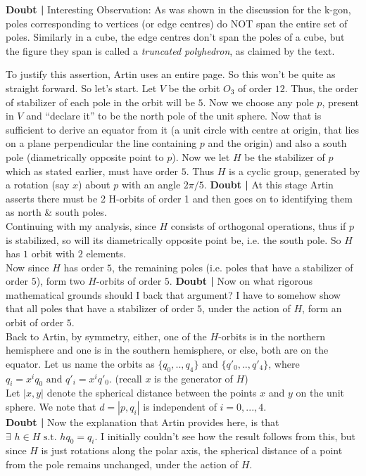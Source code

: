 \begin{aenumerate}
\par
{\bf Doubt | }Interesting Observation: As was shown in the discussion for the k-gon, poles corresponding to vertices (or edge centres) do NOT span the entire set of poles. Similarly in a cube, the edge centres don't span the poles of a cube, but the figure they span is called a \emph{truncated polyhedron}, as claimed by the text.
\item
To justify this assertion, Artin uses an entire page. So this won't be quite as straight forward. So let's start. Let $V$ be the orbit $O_{3}$ of order $12$. Thus, the order of stabilizer of each pole in the orbit will be $5$. Now we choose any pole $p$, present in $V$ and ``declare it'' to be the north pole of the unit sphere. Now that is sufficient to derive an equator from it (a unit circle with centre at origin, that lies on a plane perpendicular the line containing $p$ and the origin) and also a south pole (diametrically opposite point to $p$). Now we let $H$ be the stabilizer of $p$ which as stated earlier, must have order $5$. Thus $H$ is a cyclic group, generated by a rotation (say $x$) about $p$ with an angle $2\pi/5$. {\bf Doubt | } At this stage Artin asserts there must be 2 H-orbits of order 1 and then goes on to identifying them as north \& south poles.\\
Continuing with my analysis, since $H$ consists of orthogonal operations, thus if $p$ is stabilized, so will its diametrically opposite point be, i.e. the south pole. So $H$ has $1$ orbit with $2$ elements.\\
Now since $H$ has order $5$, the remaining poles (i.e. poles that have a stabilizer of order $5$), form two $H$-orbits of order $5$.
{\bf Doubt | }Now on what rigorous mathematical grounds should I back that argument? I have to somehow show that all poles that have a stabilizer of order $5$, under the action of $H$, form an orbit of order $5$.\\
Back to Artin, by symmetry, either, one of the $H$-orbits is in the northern hemisphere and one is in the southern hemisphere, or else, both are on the equator. Let us name the orbits as $\{q_{0},..,q_{4}\}$ and $\{q'_{0},..,q'_{4}\}$, where $q_{i}=x^{i}q_{0} \text{ and } q'_{i}=x^{i}q'_{0}$. (recall $x$ is the generator of $H$)\\Let $|x,y|$ denote the spherical distance between the points $x$ and $y$ on the unit sphere. We note that $d=|p,q_{i}|$ is independent of $i=0,...,4$.\\
{\bf Doubt | } Now the explanation that Artin provides here, is that $\exists\,\,h \in H \text { s.t. } hq_{0}=q_{i}$. I initially couldn't see how the result follows from this, but since $H$ is just rotations along the polar axis, the spherical distance of a point from the pole remains unchanged, under the action of $H$.\\

\end{aenumerate}
